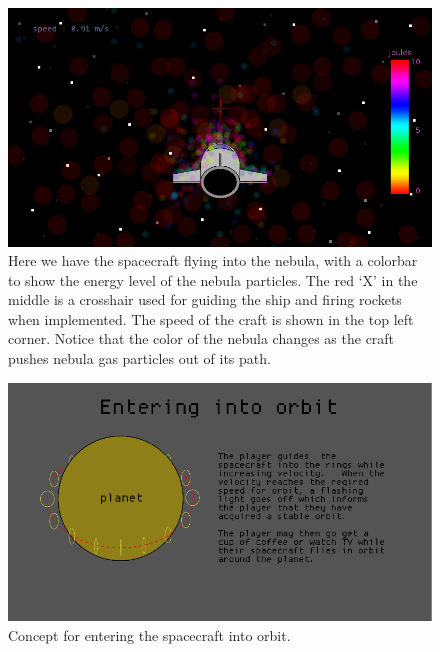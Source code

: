 \begin{figure}[H]
  \centering
  \includegraphics[scale=0.5]{../../milestone2/images/10-nebula.png}
  \caption{Here we have the spacecraft flying into the nebula, with a colorbar to show the energy level of the nebula particles.  The red `X' in the middle is a crosshair used for guiding the ship and firing rockets when implemented.  The speed of the craft is shown in the top left corner.  Notice that the color of the nebula changes as the craft pushes nebula gas particles out of its path.}
\end{figure}

\begin{figure}[H]
  \centering
  \includegraphics[scale=0.5]{../../milestone2/images/12-orbit.png}
  \caption{Concept for entering the spacecraft into orbit.}
\end{figure}





